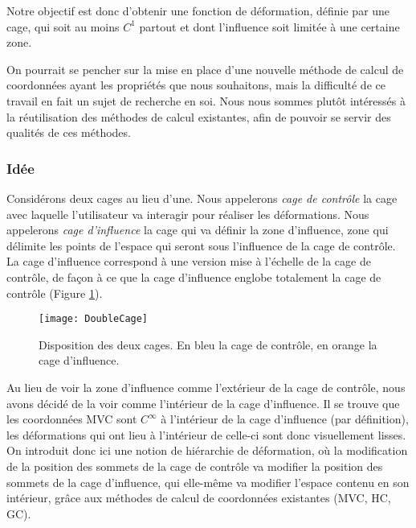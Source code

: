 Notre objectif est donc d'obtenir une fonction de déformation, définie par une
cage, qui soit au moins $C^1$ partout et dont l'influence soit limitée à une
certaine zone.

On pourrait se pencher sur la mise en place d'une nouvelle méthode de calcul
de coordonnées ayant les propriétés que nous souhaitons, mais la difficulté de
ce travail en fait un sujet de recherche en soi. Nous nous sommes plutôt
intéressés à la réutilisation des méthodes de calcul existantes, afin de
pouvoir se servir des qualités de ces méthodes.

\subsubsection{Idée}

Considérons deux cages au lieu d'une. Nous appelerons \textit{cage de
contrôle} la cage avec laquelle l'utilisateur va interagir pour réaliser les
déformations. Nous appelerons \textit{cage d'influence} la cage qui va définir
la zone d'influence, zone qui délimite les points de l'espace qui seront sous
l'influence de la cage de contrôle. La cage d'influence correspond à une
version mise à l'échelle de la cage de contrôle, de façon à ce que la cage
d'influence englobe totalement la cage de contrôle (Figure \ref{MELDou}).

\begin{figure}[ht]
  \begin{center}
    \texttt{[image: DoubleCage]}

    \caption[Disposition des cages de contrôle et d'influence] {Disposition
des deux cages. En bleu la cage de contrôle, en orange la cage d'influence.}

    \label{MELDou}
  \end{center}
\end{figure}

Au lieu de voir la zone d'influence comme l'extérieur de la cage de contrôle,
nous avons décidé de la voir comme l'intérieur de la cage d'influence. Il se
trouve que les coordonnées MVC sont $C^{\infty}$ à l'intérieur de la cage
d'influence (par définition), les déformations qui ont lieu à l'intérieur de
celle-ci sont donc visuellement lisses. On introduit donc ici une notion de
hiérarchie de déformation, où la modification de la position des sommets de la
cage de contrôle va modifier la position des sommets de la cage d'influence,
qui elle-même va modifier l'espace contenu en son intérieur, grâce aux
méthodes de calcul de coordonnées existantes (MVC, HC, GC). \\

